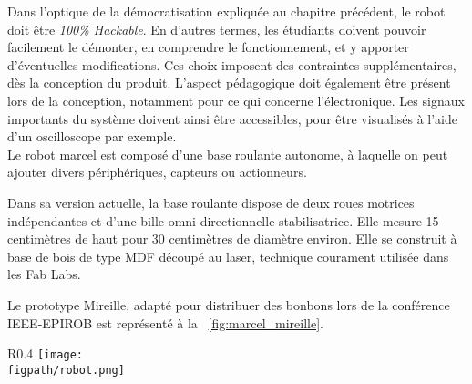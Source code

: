 \documentclass[a4paper,12pt]{report}
\newcommand{\figpath}{figures}
\begin{document}
Dans l'optique de la démocratisation expliquée au chapitre précédent, le robot doit être \emph{100\% Hackable}.
En d'autres termes, les étudiants doivent pouvoir facilement le démonter, en comprendre le fonctionnement, et y apporter d'éventuelles modifications.
Ces choix imposent des contraintes supplémentaires, dès la conception du produit.
L'aspect pédagogique doit également être présent lors de la conception, notamment pour ce qui concerne l'électronique.
Les signaux importants du système doivent ainsi être accessibles, pour être visualisés à l'aide d'un oscilloscope par exemple.\\


Le robot marcel est composé d'une base roulante autonome, à laquelle on peut ajouter divers périphériques, capteurs ou actionneurs.

Dans sa version actuelle, la base roulante dispose de deux roues motrices indépendantes et d'une bille omni-directionnelle stabilisatrice.
Elle mesure 15 centimètres de haut pour 30 centimètres de diamètre environ.
Elle se construit à base de bois de type MDF découpé au laser, technique courament utilisée dans les Fab Labs.

Le prototype \og{}Mireille\fg{}, adapté pour distribuer des bonbons lors de la conférence IEEE-EPIROB est représenté à la \figurename~\ref{fig:marcel_mireille}.



\begin{wrapfigure}{R}{0.4\textwidth}
	\centering
	\texttt{[image: \\figpath/robot.png]}
	\caption{\label{fig:marcel_mireille}Base roulante Marcel : Prototye \og{}Mireille\fg{}.}
\end{wrapfigure}


\end{document}
